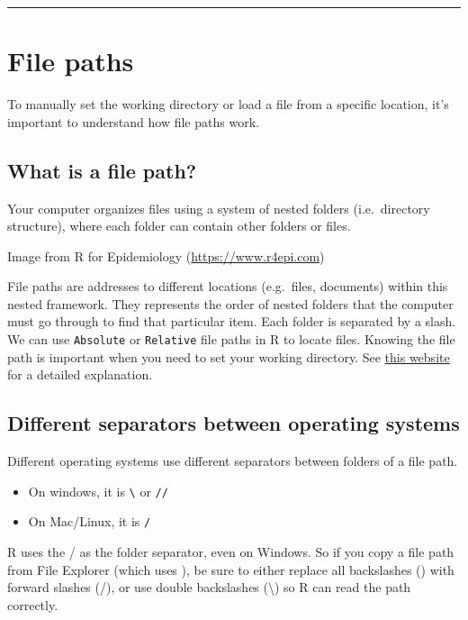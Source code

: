 \documentclass[
]{book}
\providecommand{\tightlist}{%
  \setlength{\itemsep}{0pt}\setlength{\parskip}{0pt}}
\begin{document}
\begin{center}\rule{0.5\linewidth}{0.5pt}\end{center}

\chapter{File paths}\label{file}

To manually set the working directory or load a file from a specific location, it's important to understand how file paths work.

\section{What is a file path?}\label{what-is-a-file-path}

Your computer organizes files using a system of nested folders (i.e.~directory structure), where each folder can contain other folders or files.

Image from R for Epidemiology (\url{https://www.r4epi.com})

File paths are addresses to different locations (e.g.~files, documents) within this nested framework. They represents the order of nested folders that the computer must go through to find that particular item. Each folder is separated by a slash. We can use \texttt{Absolute} or \texttt{Relative} file paths in R to locate files. Knowing the file path is important when you need to set your working directory. See \href{https://www.r4epi.com/file-paths}{this website} for a detailed explanation.

\section{Different separators between operating systems}\label{different-separators-between-operating-systems}

Different operating systems use different separators between folders of a file path.

\begin{itemize}
\tightlist
\item
  On windows, it is \texttt{\textbackslash{}} or \texttt{//}
\item
  On Mac/Linux, it is \texttt{/}
\end{itemize}

R uses the / as the folder separator, even on Windows. So if you copy a file path from File Explorer (which uses ), be sure to either replace all backslashes () with forward slashes (/), or use double backslashes (\textbackslash) so R can read the path correctly.
\end{document}
